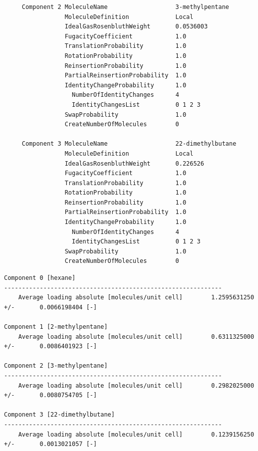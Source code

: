 \begin{tiny}
\begin{verbatim}
     Component 2 MoleculeName                   3-methylpentane
                 MoleculeDefinition             Local
                 IdealGasRosenbluthWeight       0.0536003
                 FugacityCoefficient            1.0
                 TranslationProbability         1.0
                 RotationProbability            1.0
                 ReinsertionProbability         1.0
                 PartialReinsertionProbability  1.0
                 IdentityChangeProbability      1.0
                   NumberOfIdentityChanges      4
                   IdentityChangesList          0 1 2 3
                 SwapProbability                1.0
                 CreateNumberOfMolecules        0
     
     Component 3 MoleculeName                   22-dimethylbutane
                 MoleculeDefinition             Local
                 IdealGasRosenbluthWeight       0.226526
                 FugacityCoefficient            1.0
                 TranslationProbability         1.0
                 RotationProbability            1.0
                 ReinsertionProbability         1.0
                 PartialReinsertionProbability  1.0
                 IdentityChangeProbability      1.0
                   NumberOfIdentityChanges      4
                   IdentityChangesList          0 1 2 3
                 SwapProbability                1.0
                 CreateNumberOfMolecules        0
\end{verbatim}
\end{tiny}

\begin{tiny}
\begin{verbatim}
Component 0 [hexane]
-------------------------------------------------------------
    Average loading absolute [molecules/unit cell]        1.2595631250 +/-       0.0066198404 [-]

Component 1 [2-methylpentane]
    Average loading absolute [molecules/unit cell]        0.6311325000 +/-       0.0086401923 [-]

Component 2 [3-methylpentane]
-------------------------------------------------------------
    Average loading absolute [molecules/unit cell]        0.2982025000 +/-       0.0080754705 [-]

Component 3 [22-dimethylbutane]
-------------------------------------------------------------
    Average loading absolute [molecules/unit cell]        0.1239156250 +/-       0.0013021057 [-]
\end{verbatim}
\end{tiny}

